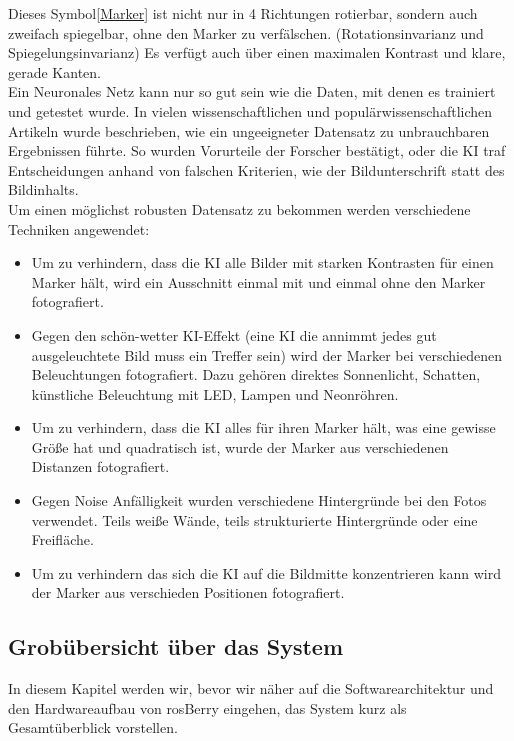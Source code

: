 \documentclass[conference]{IEEEtran}
\begin{document}
Dieses Symbol\ref{Marker} ist nicht nur in 4 Richtungen rotierbar, sondern auch zweifach spiegelbar, ohne den Marker zu verfälschen. (Rotationsinvarianz und Spiegelungsinvarianz)
Es verfügt auch über einen maximalen Kontrast und klare, gerade Kanten.
\\
\noindent
Ein Neuronales Netz kann nur so gut sein wie die Daten, mit denen es trainiert und getestet wurde.
In vielen wissenschaftlichen und populärwissenschaftlichen Artikeln wurde beschrieben, wie ein ungeeigneter Datensatz zu unbrauchbaren Ergebnissen führte.
So wurden Vorurteile der Forscher bestätigt, oder die KI traf Entscheidungen anhand von falschen Kriterien, wie der Bildunterschrift statt des Bildinhalts.
\\
Um einen möglichst robusten Datensatz zu bekommen werden verschiedene Techniken angewendet:
\begin{itemize}
	\item Um zu verhindern, dass die KI alle Bilder mit starken Kontrasten für einen Marker hält, wird ein Ausschnitt einmal mit und einmal ohne den Marker fotografiert.
	\item Gegen den \glqq schön-wetter KI\grqq-Effekt (eine KI die annimmt jedes gut ausgeleuchtete Bild muss ein Treffer sein) wird der Marker bei verschiedenen Beleuchtungen fotografiert.
	Dazu gehören direktes Sonnenlicht, Schatten, künstliche Beleuchtung mit LED, Lampen und Neonröhren. 
	\item Um zu verhindern, dass die KI alles für ihren Marker hält, was eine gewisse Größe hat und quadratisch ist, wurde der Marker aus verschiedenen Distanzen fotografiert. 
	\item Gegen Noise Anfälligkeit wurden verschiedene Hintergründe bei den Fotos verwendet. Teils weiße Wände, teils strukturierte Hintergründe oder eine Freifläche. 
	\item Um zu verhindern das sich die KI auf die Bildmitte konzentrieren kann wird der Marker aus verschieden Positionen fotografiert. 
\end{itemize}

\subsection{Grobübersicht über das System}
In diesem Kapitel werden wir, bevor wir näher auf die Softwarearchitektur und den Hardwareaufbau von rosBerry eingehen, das System kurz als Gesamtüberblick vorstellen.
\end{document}
